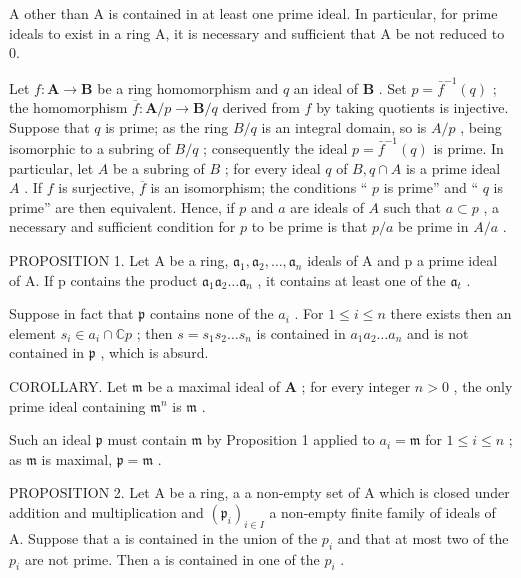 A other than A is contained in at least one prime ideal. In particular, for prime ideals to exist in a ring A, it is necessary and sufficient that A be not reduced to 0.

Let \(f: \mathbf{A} \to \mathbf{B}\) be a ring homomorphism and \(q\) an ideal of \(\mathbf{B}\) . Set \(p = \bar{f}^{-1}(q)\) ; the homomorphism \(\overline{f}: \mathbf{A}/p \to \mathbf{B}/q\) derived from \(f\) by taking quotients is injective. Suppose that \(q\) is prime; as the ring \(B/q\) is an integral domain, so is \(A/p\) , being isomorphic to a subring of \(B/q\) ; consequently the ideal \(p = \bar{f}^{-1}(q)\) is prime. In particular, let \(A\) be a subring of \(B\) ; for every ideal \(q\) of \(B, q \cap A\) is a prime ideal \(A\) . If \(f\) is surjective, \(\overline{f}\) is an isomorphism; the conditions `` \(p\) is prime'' and `` \(q\) is prime'' are then equivalent. Hence, if \(p\) and \(a\) are ideals of \(A\) such that \(a \subset p\) , a necessary and sufficient condition for \(p\) to be prime is that \(p/a\) be prime in \(A/a\) .

PROPOSITION 1. Let A be a ring, \(\mathfrak{a}_1, \mathfrak{a}_2, \ldots, \mathfrak{a}_n\) ideals of A and p a prime ideal of A. If p contains the product \(\mathfrak{a}_1\mathfrak{a}_2 \ldots \mathfrak{a}_n\) , it contains at least one of the \(\mathfrak{a}_t\) .

Suppose in fact that \(\mathfrak{p}\) contains none of the \(a_{i}\) . For \(1 \leqslant i \leqslant n\) there exists then an element \(s_{i} \in a_{i} \cap \mathbb{C}p\) ; then \(s = s_{1}s_{2} \ldots s_{n}\) is contained in \(a_{1}a_{2} \ldots a_{n}\) and is not contained in \(\mathfrak{p}\) , which is absurd.

COROLLARY. Let \(\mathfrak{m}\) be a maximal ideal of \(\mathbf{A}\) ; for every integer \(n > 0\) , the only prime ideal containing \(\mathfrak{m}^n\) is \(\mathfrak{m}\) .

Such an ideal \(\mathfrak{p}\) must contain \(\mathfrak{m}\) by Proposition 1 applied to \(a_{i} = \mathfrak{m}\) for \(1 \leqslant i \leqslant n\) ; as \(\mathfrak{m}\) is maximal, \(\mathfrak{p} = \mathfrak{m}\) .

PROPOSITION 2. Let A be a ring, a a non-empty set of A which is closed under addition and multiplication and \((\mathfrak{p}_{i})_{i\in I}\) a non-empty finite family of ideals of A. Suppose that a is contained in the union of the \(p_{i}\) and that at most two of the \(p_{i}\) are not prime. Then a is contained in one of the \(p_{i}\) .

